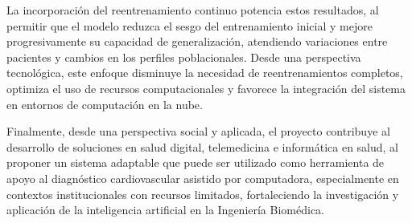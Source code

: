 La incorporación del reentrenamiento continuo potencia estos resultados, al permitir que el modelo reduzca el sesgo del entrenamiento inicial y mejore progresivamente su capacidad de generalización, atendiendo variaciones entre pacientes y cambios en los perfiles poblacionales. Desde una perspectiva tecnológica, este enfoque disminuye la necesidad de reentrenamientos completos, optimiza el uso de recursos computacionales y favorece la integración del sistema en entornos de computación en la nube.

Finalmente, desde una perspectiva social y aplicada, el proyecto contribuye al desarrollo de soluciones en salud digital, telemedicina e informática en salud, al proponer un sistema adaptable que puede ser utilizado como herramienta de apoyo al diagnóstico cardiovascular asistido por computadora, especialmente en contextos institucionales con recursos limitados, fortaleciendo la investigación y aplicación de la inteligencia artificial en la Ingeniería Biomédica.
